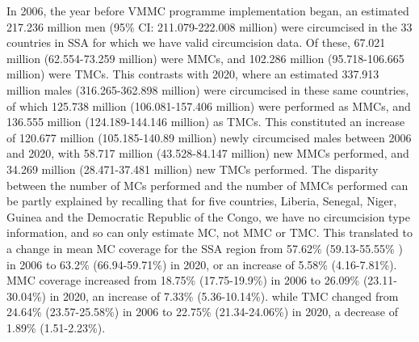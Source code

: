 \documentclass{article}
\begin{document}
In 2006, the year before VMMC programme implementation began, an
estimated 217.236 million men (95\% CI: 211.079-222.008 million) were circumcised in the 33 countries in SSA for which we have valid circumcision data. 
Of these, 67.021 million (62.554-73.259 million) were MMCs, and 102.286 million (95.718-106.665 million) were TMCs. This contrasts with 2020, where an estimated 337.913 million males (316.265-362.898 million) were circumcised in these same countries, of which 125.738 million (106.081-157.406 million) were performed as MMCs, and 136.555 million (124.189-144.146 million) as TMCs. 
This constituted an increase of 120.677 million (105.185-140.89 million) newly circumcised males between 2006 and 2020, with 58.717 million (43.528-84.147 million) new MMCs performed, and 34.269 million (28.471-37.481 million) new TMCs performed. 
The disparity between the number of MCs performed and the number of MMCs performed can be partly explained by recalling that for five countries, Liberia, Senegal, Niger, Guinea and the Democratic Republic of the Congo, we have no circumcision type information, and so can only estimate MC, not MMC or TMC. This translated to a change in mean MC coverage for the SSA region from 57.62\% (59.13-55.55\% ) in 2006 to 63.2\% (66.94-59.71\%) in 2020, or an increase of 5.58\% (4.16-7.81\%). 
MMC coverage increased from 18.75\% (17.75-19.9\%) in 2006 to 26.09\% (23.11-30.04\%) in 2020, an increase of 7.33\% (5.36-10.14\%). while TMC changed from 24.64\% (23.57-25.58\%) in 2006 to 22.75\% (21.34-24.06\%) in 2020, a decrease of 1.89\% (1.51-2.23\%).
\end{document}
